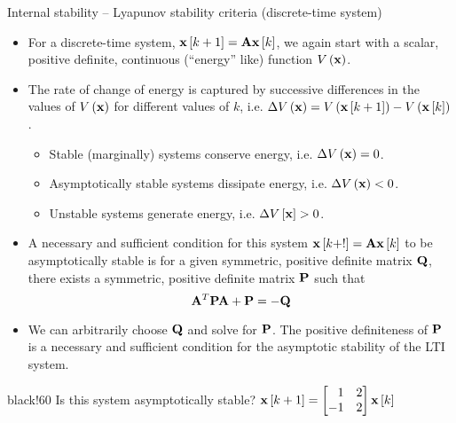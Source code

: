 \documentclass[aspectratio=169]{beamer}
\def\mf{\ensuremath\mathbf}
\def\lp{\ensuremath\left(}
\def\rp{\ensuremath\right)}
\def\ls{\ensuremath\left[}
\def\rs{\ensuremath\right]}
\def\bmx{\ensuremath\begin{bmatrix*}[r]}
\def\emx{\ensuremath\end{bmatrix*}}
\newcommand{\demoex}[2]{\onslide<#1->\begin{color}{black!60} #2 \end{color}}
\newcommand{\ct}[1]{\lp #1\rp}
\newcommand{\dt}[1]{\ls #1\rs}
\begin{document}
\begin{frame}{Internal stability -- Lyapunov stability criteria (discrete-time system)}
\begin{small}
\begin{itemize}
    \item For a discrete-time system, $\mf{x}\dt{k + 1} = \mf{A}\mf{x}\dt{k}$, we again start with a scalar, positive definite, continuous (``energy'' like) function $V\ct{\mf{x}}$.

    \item The rate of change of energy is captured by successive differences in the values of $V\ct{\mf{x}}$ for different values of $k$, i.e. $\Delta V\ct{\mf{x}} = V\ct{\mf{x}\dt{k + 1}} - V\ct{\mf{x}\dt{k}}$.
    \begin{itemize}
      \item {\small Stable (marginally) systems conserve energy, i.e. $\Delta V\ct{\mf{x}} = 0$.}
      \item {\small Asymptotically stable systems dissipate energy, i.e. $\Delta V\ct{\mf{x}} < 0$.}
      \item {\small Unstable systems generate energy, i.e. $\Delta V\dt{\mf{x}} > 0$.}
    \end{itemize}

    \item A necessary and sufficient condition for this system $\mf{x}\dt{k+!} = \mf{A}\mf{x}\dt{k}$ to be asymptotically stable is for a given symmetric, positive definite matrix $\mf{Q}$, there exists a symmetric, positive definite matrix $\mf{P}$ such that
    \[ \mf{A}^T\mf{P}\mf{A} + \mf{P} = - \mf{Q} \] 

    \item We can arbitrarily choose $\mf{Q}$ and solve for $\mf{P}$. The positive definiteness of $\mf{P}$ is a necessary and sufficient condition for the asymptotic stability of the LTI system.
\end{itemize}
\demoex{2}{Is this system asymptotically stable? $\mf{x}\dt{k+1} = \bmx 1 & 2 \\ -1 & 2 \emx\mf{x}\dt{k}$}
\end{small}
\end{frame}
\end{document}
